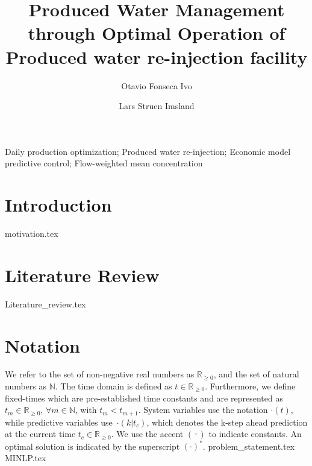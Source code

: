 \documentclass[authoryear]{elsarticle}
\begin{document}
\begin{frontmatter}

\title{Produced Water Management through Optimal Operation of Produced water re-injection facility }

\author[1]{Otavio Fonseca Ivo
}

\author[1]{Lars Struen Imsland
}

\address[1]{Department of Engineering Cybernetics, Norwegian University of Science and Technology, O. S. Bragstads plass 2, 7034 Trondheim, Norway}


\begin{abstract}
    
\end{abstract}
\begin{keyword}
Daily production optimization; Produced water re-injection; Economic model predictive control; Flow-weighted mean concentration
\end{keyword}
\end{frontmatter}
\section{Introduction}
{motivation.tex}

\section{Literature Review}
{Literature_review.tex}
\section{Notation}
We refer to the set of non-negative real numbers as $\mathbb{R}_{\geq 0}$, and the set of natural numbers as $\mathbb{N}$. The time domain is defined as $t \in \mathbb{R}_{\geq 0}$. Furthermore, we define fixed-times which are pre-established time constants and are represented as $t_m \in \mathbb{R}_{\geq 0},\, \forall m \in \mathbb{N}$, with $t_m < t_{m+1}$.  System variables use the notation $\cdot(t)$, while predictive variables use~$\cdot(k\vert{t_c})$, which denotes the k-step ahead prediction at the current time $t_c\in\mathbb{R}_{\geq{0}}$. We use the accent $(\bar{\cdot})$ to indicate constants. An optimal solution is indicated by the superscript ${\left(\cdot\right)}^*$.
{problem_statement.tex}
{MINLP.tex}
\end{document}
